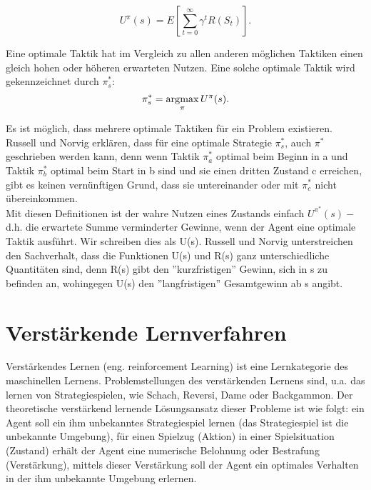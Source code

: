 \begin{equation}
\label{eq:Der erwartete Nutzen}
U^\pi(s) = E\left[\sum_{t=0}^{\infty} \gamma^t R(S_t)\right].
\end{equation}

Eine optimale Taktik hat im Vergleich zu allen anderen möglichen Taktiken einen gleich hohen oder höheren erwarteten Nutzen. Eine solche optimale Taktik wird gekennzeichnet durch $\pi^*_s$: \\ 

\begin{equation}
\pi^*_s = \operatorname*{arg\!\max}_\pi U^\pi(s).
\end{equation}

Es ist möglich, dass mehrere optimale Taktiken für ein Problem existieren. Russell und Norvig erklären, dass für eine optimale Strategie $\pi^*_s$, auch $\pi^*$ geschrieben werden kann, denn wenn Taktik $\pi^*_a$ optimal beim Beginn in a und Taktik $\pi^*_b$ optimal beim Start in b sind und sie einen dritten Zustand c erreichen, gibt es keinen vernünftigen Grund, dass sie untereinander oder mit $\pi^*_c$ nicht übereinkommen. \\

Mit diesen Definitionen ist der wahre Nutzen eines Zustands einfach $U^{\pi^*}(s) -$ d.h. die erwartete Summe verminderter Gewinne, wenn der Agent eine optimale Taktik ausführt. Wir schreiben dies als U(s). Russell und Norvig unterstreichen den Sachverhalt, dass die Funktionen U(s) und R(s) ganz unterschiedliche Quantitäten sind, denn R(s) gibt den ''kurzfristigen'' Gewinn, sich in s zu befinden an, wohingegen U(s) den ''langfristigen'' Gesamtgewinn ab s angibt.
\newpage

\section{Verstärkende Lernverfahren}
Verstärkendes Lernen (eng. reinforcement Learning) ist eine Lernkategorie des maschinellen Lernens. Problemstellungen des verstärkenden Lernens sind, u.a. das lernen von Strategiespielen, wie Schach, Reversi, Dame oder Backgammon. Der theoretische verstärkend lernende Lösungsansatz dieser Probleme ist wie folgt: ein Agent soll ein ihm unbekanntes Strategiespiel lernen (das Strategiespiel ist die unbekannte Umgebung), für einen Spielzug  (Aktion) in einer Spielsituation (Zustand) erhält der Agent eine numerische Belohnung oder Bestrafung (Verstärkung), mittels dieser Verstärkung soll der Agent ein optimales Verhalten in der ihm unbekannte Umgebung erlernen. \\

